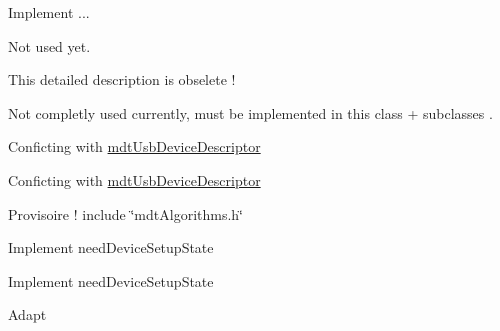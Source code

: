 \begin{DoxyRefList}
Implement ...  
\item[\label{todo__todo000003}%
\hypertarget{todo__todo000003}{}%
Member \hyperlink{classmdt_data_table_manager_a1e19b3f34c1b0a91bcae4396731efc57}{mdt\-Data\-Table\-Manager\-:\-:set\-Data\-Set\-Directory} (const Q\-Dir \&dir)]Not used yet.  
\item[\label{todo__todo000010}%
\hypertarget{todo__todo000010}{}%
Class \hyperlink{classmdt_device}{mdt\-Device} ]This detailed description is obselete ! 
\item[\label{todo__todo000011}%
\hypertarget{todo__todo000011}{}%
Member \hyperlink{classmdt_device_a79ca328ff9e9f413a38c1cc9c9267cee}{mdt\-Device\-:\-:last\-Error} () const ]Not completly used currently, must be implemented in this class + subclasses .  
\item[\label{todo__todo000025}%
\hypertarget{todo__todo000025}{}%
Member \hyperlink{classmdt_device_info_afe4bbdc87acff59999905a0eeb812fe1}{mdt\-Device\-Info\-:\-:product\-Name} () const ]Conficting with \hyperlink{classmdt_usb_device_descriptor}{mdt\-Usb\-Device\-Descriptor}  
\item[\label{todo__todo000024}%
\hypertarget{todo__todo000024}{}%
Member \hyperlink{classmdt_device_info_a207d7b6b49fd65726232e95cd9e0568c}{mdt\-Device\-Info\-:\-:vendor\-Name} () const ]Conficting with \hyperlink{classmdt_usb_device_descriptor}{mdt\-Usb\-Device\-Descriptor}  
\item[\label{todo__todo000012}%
\hypertarget{todo__todo000012}{}%
Member \hyperlink{classmdt_device_modbus_ac69cfbe26681342ba05672ab63de2a1f}{mdt\-Device\-Modbus\-:\-:mdt\-Device\-Modbus} (Q\-Object $\ast$parent=0)]Provisoire ! include \char`\"{}mdt\-Algorithms.\-h\char`\"{}  
\item[\label{todo__todo000013}%
\hypertarget{todo__todo000013}{}%
Member \hyperlink{classmdt_device_modbus_wago_module_aa775cffab72f7ed7cd92a48d26da3225}{mdt\-Device\-Modbus\-Wago\-Module\-:\-:read\-Registers} (int first\-Channel, int last\-Channel, bool need\-Device\-Setup\-State)]Implement need\-Device\-Setup\-State  
\item[\label{todo__todo000015}%
\hypertarget{todo__todo000015}{}%
Member \hyperlink{classmdt_device_modbus_wago_module_a90bd4625c8b1efcd34cd56b31dc2f72c}{mdt\-Device\-Modbus\-Wago\-Module\-:\-:read\-Status\-Bytes} (int first\-Channel, int last\-Channel, bool need\-Device\-Setup\-State)]Implement need\-Device\-Setup\-State  
\item[\label{todo__todo000017}%
\hypertarget{todo__todo000017}{}%
Member \hyperlink{classmdt_device_modbus_wago_module_adf7431cd4d41d7839b42cc21badeabc5}{mdt\-Device\-Modbus\-Wago\-Module\-:\-:setup\-From\-Register\-Word} (quint16 word)]Adapt 

\end{DoxyRefList}
